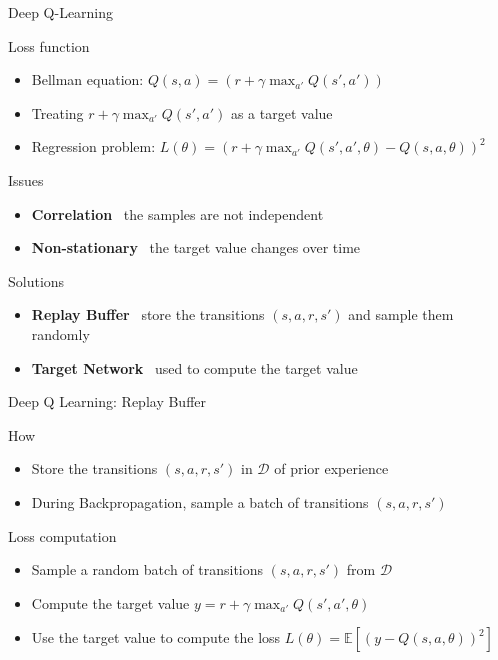 \documentclass[presentation, 9pt]{beamer}\mode<presentation>{\usetheme{AMSBolognaFC}}
\begin{document}
\begin{frame}{Deep Q-Learning}
	\begin{alertblock}{Loss function}
		\begin{itemize}
			\item Bellman equation: $Q(s, a) = (r + \gamma \max_{a'} Q(s', a'))$
			\item Treating $r + \gamma \max_{a'} Q(s', a')$ as a target value
			\item Regression problem: $L(\theta) = (r + \gamma \max_{a'} Q(s', a', \theta) - Q(s, a, \theta))^2$
		\end{itemize}
	\end{alertblock}
	\begin{block}{Issues}
		\begin{itemize}
			\item \textbf{Correlation} \faArrowRight \, the samples are not independent
			\item \textbf{Non-stationary} \faArrowRight \, the target value changes over time
		\end{itemize}
	\end{block}
	\begin{alertblock}{Solutions}
		\begin{itemize}
			\item \textbf{Replay Buffer} \faArrowRight \, store the transitions $(s, a, r, s')$ and sample them randomly
			\item \textbf{Target Network} \faArrowRight \, used to compute the target value
		\end{itemize}
	\end{alertblock}
\end{frame}
\begin{frame}{Deep Q Learning: Replay Buffer}
	\centering
	\begin{block}{How}
		\begin{itemize}
			\item Store the transitions $(s, a, r, s')$ in $\mathcal{D}$ of prior experience
			\item During Backpropagation, sample a batch of transitions $(s, a, r, s')$ 
		\end{itemize}
	\end{block}
	\begin{block}{Loss computation}
		\begin{itemize}
			\item Sample a random batch of transitions $(s, a, r, s')$ from $\mathcal{D}$
			\item Compute the target value $y = r + \gamma \max_{a'} Q(s', a', \theta)$
			\item Use the target value to compute the loss $L(\theta) = \mathbb{E}[(y - Q(s, a, \theta))^2]$
		\end{itemize}
	\end{block}
\end{frame}
\end{document}
